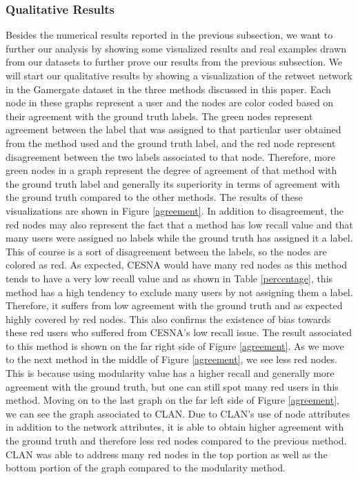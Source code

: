 \subsubsection{Qualitative Results} Besides the numerical results reported in the previous subsection, we want to further our analysis by showing some visualized results and real examples drawn from our datasets to further prove our results from the previous subsection. We will start our qualitative results by showing a visualization of the retweet network in the Gamergate dataset in the three methods discussed in this paper. Each node in these graphs represent a user and the nodes are color coded based on their agreement with the ground truth labels. The green nodes represent agreement between the label that was assigned to that particular user obtained from the method used and the ground truth label, and the red node represent disagreement between the two labels associated to that node. Therefore, more green nodes in a graph represent the degree of agreement of that method with the ground truth label and generally its superiority in terms of agreement with the ground truth compared to the other methods. The results of these visualizations are shown in Figure \ref{agreement}.
In addition to disagreement, the red nodes may also represent the fact that a method has low recall value and that many users were assigned no labels while the ground truth has assigned it a label. This of course is a sort of disagreement between the labels, so the nodes are colored as red. As expected, CESNA would have many red nodes as this method tends to have a very low recall value and as shown in Table \ref{percentage}, this method has a high tendency to exclude many users by not assigning them a label. Therefore, it suffers from low agreement with the ground truth and as expected highly covered by red nodes. This also confirms the existence of bias towards these red users who suffered from CESNA's low recall issue. The result associated to this method is shown on the far right side of Figure \ref{agreement}. As we move to the next method in the middle of Figure \ref{agreement}, we see less red nodes. This is because using modularity value has a higher recall and generally more agreement with the ground truth, but one can still spot many red users in this method. Moving on to the last graph on the far left side of Figure \ref{agreement}, we can see the graph associated to CLAN. Due to CLAN's use of node attributes in addition to the network attributes, it is able to obtain higher agreement with the ground truth and therefore less red nodes compared to the previous method. CLAN was able to address many red nodes in the top portion as well as the bottom portion of the graph compared to the modularity method.
